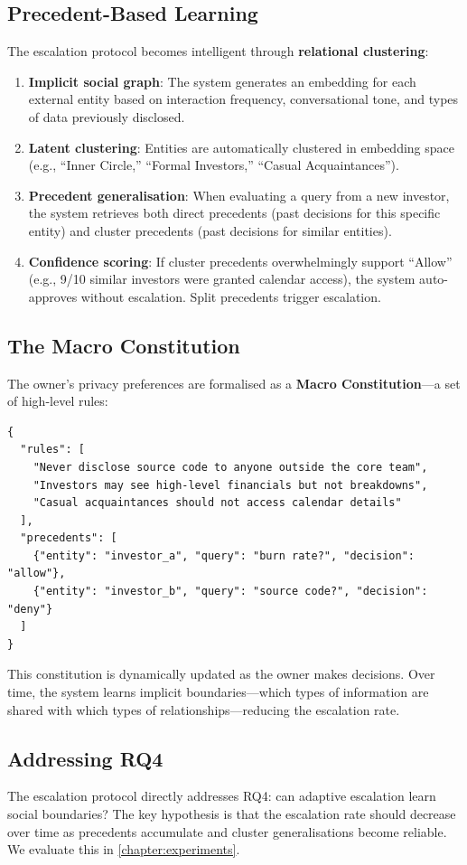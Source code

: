 \subsection{Precedent-Based Learning}

The escalation protocol becomes intelligent through \textbf{relational clustering}:

\begin{enumerate}
    \item \textbf{Implicit social graph}: The system generates an embedding for each external entity based on interaction frequency, conversational tone, and types of data previously disclosed.
    \item \textbf{Latent clustering}: Entities are automatically clustered in embedding space (e.g., ``Inner Circle,'' ``Formal Investors,'' ``Casual Acquaintances'').
    \item \textbf{Precedent generalisation}: When evaluating a query from a new investor, the system retrieves both direct precedents (past decisions for this specific entity) and cluster precedents (past decisions for similar entities).
    \item \textbf{Confidence scoring}: If cluster precedents overwhelmingly support ``Allow'' (e.g., 9/10 similar investors were granted calendar access), the system auto-approves without escalation. Split precedents trigger escalation.
\end{enumerate}

\subsection{The Macro Constitution}

The owner's privacy preferences are formalised as a \textbf{Macro Constitution}---a set of high-level rules:

\begin{verbatim}
{
  "rules": [
    "Never disclose source code to anyone outside the core team",
    "Investors may see high-level financials but not breakdowns",
    "Casual acquaintances should not access calendar details"
  ],
  "precedents": [
    {"entity": "investor_a", "query": "burn rate?", "decision": "allow"},
    {"entity": "investor_b", "query": "source code?", "decision": "deny"}
  ]
}
\end{verbatim}

This constitution is dynamically updated as the owner makes decisions. Over time, the system learns implicit boundaries---which types of information are shared with which types of relationships---reducing the escalation rate.

\subsection{Addressing RQ4}

The escalation protocol directly addresses RQ4: can adaptive escalation learn social boundaries? The key hypothesis is that the escalation rate should decrease over time as precedents accumulate and cluster generalisations become reliable. We evaluate this in \cref{chapter:experiments}.
